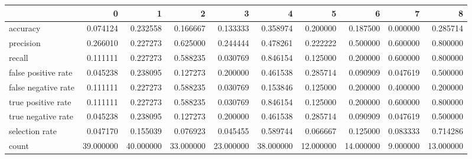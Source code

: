 \begin{tabular}{lrrrrrrrrr}
\toprule
{} &          0 &          1 &          2 &          3 &          4 &          5 &          6 &         7 &          8 \\
\midrule
accuracy            &   0.074124 &   0.232558 &   0.166667 &   0.133333 &   0.358974 &   0.200000 &   0.187500 &  0.000000 &   0.285714 \\
precision           &   0.266010 &   0.227273 &   0.625000 &   0.244444 &   0.478261 &   0.222222 &   0.500000 &  0.600000 &   0.800000 \\
recall              &   0.111111 &   0.227273 &   0.588235 &   0.030769 &   0.846154 &   0.125000 &   0.200000 &  0.600000 &   0.800000 \\
false positive rate &   0.045238 &   0.238095 &   0.127273 &   0.200000 &   0.461538 &   0.285714 &   0.090909 &  0.047619 &   0.500000 \\
false negative rate &   0.111111 &   0.227273 &   0.588235 &   0.030769 &   0.153846 &   0.125000 &   0.200000 &  0.400000 &   0.200000 \\
true positive rate  &   0.111111 &   0.227273 &   0.588235 &   0.030769 &   0.846154 &   0.125000 &   0.200000 &  0.600000 &   0.800000 \\
true negative rate  &   0.045238 &   0.238095 &   0.127273 &   0.200000 &   0.461538 &   0.285714 &   0.090909 &  0.047619 &   0.500000 \\
selection rate      &   0.047170 &   0.155039 &   0.076923 &   0.045455 &   0.589744 &   0.066667 &   0.125000 &  0.083333 &   0.714286 \\
count               &  39.000000 &  40.000000 &  33.000000 &  23.000000 &  38.000000 &  12.000000 &  14.000000 &  9.000000 &  13.000000 \\
\bottomrule
\end{tabular}
